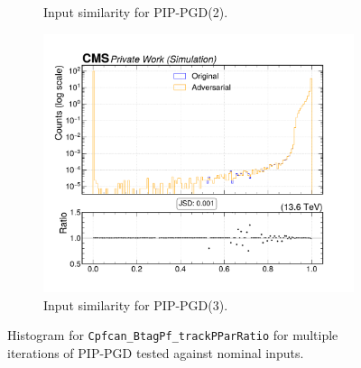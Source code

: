 \begin{figure}[htbp]
\begin{subfigure}[t]{0.32\textwidth}
    \caption*{Input similarity for PIP-PGD(2).}
  \end{subfigure}\hfill
  \begin{subfigure}[t]{0.32\textwidth}
    \includegraphics[width=\linewidth]{media/output/features/compare/combined_it_3/cmp_cpf_arr_Cpfcan_BtagPf_trackPParRatio.pdf}
    \caption*{Input similarity for PIP-PGD(3).}
  \end{subfigure}

  \caption*{Histogram for \texttt{Cpfcan\_BtagPf\_trackPParRatio} for multiple iterations of PIP-PGD tested against nominal inputs.}
  \label{fig:combined_input_Cpfcan_BtagPf_trackPParRatio}
\end{figure}

